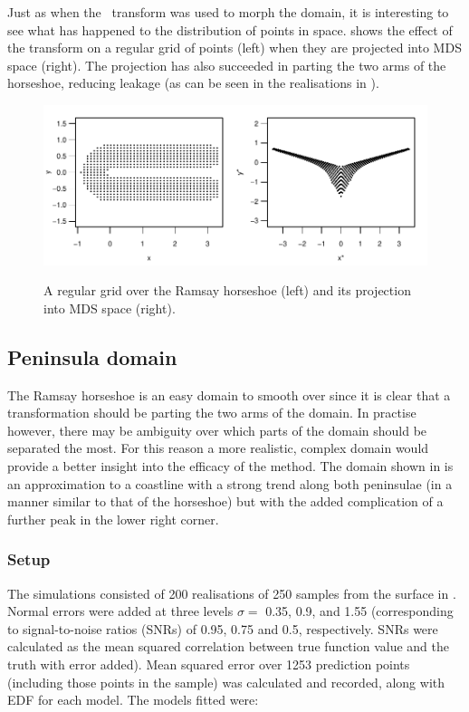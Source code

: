Just as when the \sch\ transform was used to morph the domain, it is interesting to see what has happened to the distribution of points in space.  shows the effect of the transform on a regular grid of points (left) when they are projected into MDS space (right). The projection has also succeeded in parting the two arms of the horseshoe, reducing leakage (as can be seen in the realisations in ).

\begin{figure}
\centering
\includegraphics[width=6in]{mds/figs/mdsrampoints.pdf} \\
\caption{A regular grid over the Ramsay horseshoe (left) and its projection into MDS space (right).}
\label{mdsrampoints}
\end{figure}


\subsection{Peninsula domain}
\label{mds-wt2-sim}

The Ramsay horseshoe is an easy domain to smooth over since it is clear that a transformation should be parting the two arms of the domain. In practise however, there may be ambiguity over which parts of the domain should be separated the most. For this reason a more realistic, complex domain would provide a better insight into the efficacy of the method. The domain shown in  is an approximation to a coastline with a strong trend along both peninsulae (in a manner similar to that of the horseshoe) but with the added complication of a further peak in the lower right corner.

\subsubsection{Setup}

The simulations consisted of 200 realisations of 250 samples from the surface in . Normal errors were added at three levels $\sigma=$ 0.35, 0.9, and 1.55 (corresponding to signal-to-noise ratios (SNRs) of 0.95, 0.75 and 0.5, respectively. SNRs were calculated as the mean squared correlation between true function value and the truth with error added). Mean squared error over 1253 prediction points (including those points in the sample) was calculated and recorded, along with EDF for each model. The models fitted were:

